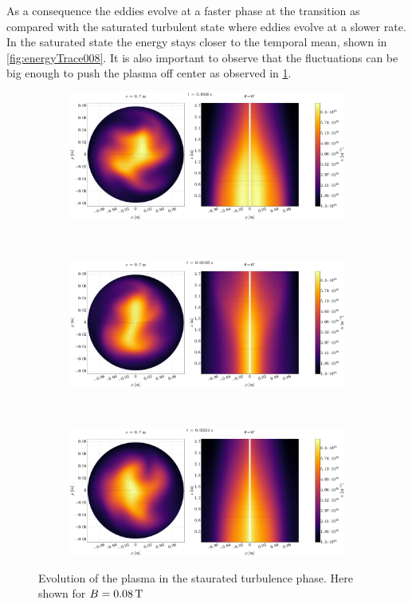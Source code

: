 As a consequence the eddies evolve at a faster phase at the transition as compared with the saturated turbulent state where eddies evolve at a slower rate.
In the saturated state the energy stays closer to the temporal mean, shown in \cref{fig:energyTrace008}.
It is also important to observe that the fluctuations can be big enough to push the plasma off center as observed in \cref{fig:turbEv}.
%
\begin{figure}[htbp]
    \centering
    \begin{subfigure}[h]{1.00\textwidth}
        \centering
        \includegraphics[width=1.0\textwidth]{fig/results/evolution/n-perpPar-2D-0}
    \end{subfigure}%
    \\
    \begin{subfigure}[h]{1.00\textwidth}
        \centering
        \includegraphics[width=1.0\textwidth]{fig/results/evolution/n-perpPar-2D-1}
    \end{subfigure}
    \\
    \begin{subfigure}[h]{1.00\textwidth}
        \centering
        \includegraphics[width=1.0\textwidth]{fig/results/evolution/n-perpPar-2D-2}
    \end{subfigure}
    \caption{Evolution of the plasma in the staurated turbulence phase.
        Here shown for $B=0.08\, \text{T}$}
    \label{fig:turbEv}
\end{figure}
